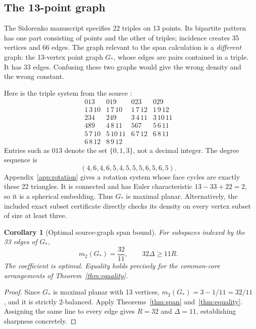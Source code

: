 \documentclass[11pt]{article}
\newtheorem{corollary}[theorem]{Corollary}
\theoremstyle{definition}
\theoremstyle{remark}
\newcommand{\1}{\mathbf 1}
\begin{document}
\subsection{The 13-point graph}

The Sidorenko manuscript specifies 22 triples on 13 points. Its bipartite
pattern has one part consisting of points and the other of triples; incidence
creates 35 vertices and 66 edges. The graph relevant to the span calculation
is a \emph{different} graph: the 13-vertex point graph $G_*$, whose edges are
pairs contained in a triple. It has 33 edges. Confusing these two graphs would
give the wrong density and the wrong constant.

Here is the triple system from the source \cite{OpenAISidorenko}:
\begin{equation}
\begin{array}{rrrr}
013&019&023&029\\
1\,3\,10&1\,7\,10&1\,7\,12&1\,9\,12\\
234&249&3\,4\,11&3\,10\,11\\
489&4\,8\,11&567&5\,6\,11\\
5\,7\,10&5\,10\,11&6\,7\,12&6\,8\,11\\
6\,8\,12&8\,9\,12&&
\end{array}
\label{eq:faces}
\end{equation}
Entries such as $013$ denote the set $\{0,1,3\}$, not a decimal integer.
The degree sequence is
\begin{equation}
 (4,6,4,6,5,4,5,5,5,6,5,6,5).
 \label{eq:degrees}
\end{equation}
Appendix~\ref{app:rotation} gives a rotation system whose face cycles are exactly
these 22 triangles. It is connected and has Euler characteristic
$13-33+22=2$, so it is a spherical embedding. Thus $G_*$ is maximal planar.
Alternatively, the included exact subset certificate directly checks its
density on every vertex subset of size at least three.

\begin{corollary}[Optimal source-graph span bound]
\label{cor:sourcegraph}
For subspaces indexed by the 33 edges of $G_*$,
\begin{equation}
 m_2(G_*)=\frac{32}{11},\qquad
 \boxed{32\Delta\ge11R.}
 \label{eq:3211}
\end{equation}
The coefficient is optimal. Equality holds precisely for the common-core
arrangements of Theorem~\ref{thm:equality}.
\end{corollary}

\begin{proof}
Since $G_*$ is maximal planar with 13 vertices,
$m_2(G_*)=3-1/11=32/11$, and it is strictly 2-balanced. Apply
Theorems~\ref{thm:span} and~\ref{thm:equality}. Assigning the same line to every
edge gives $R=32$ and $\Delta=11$, establishing sharpness concretely.
\end{proof}
\end{document}
